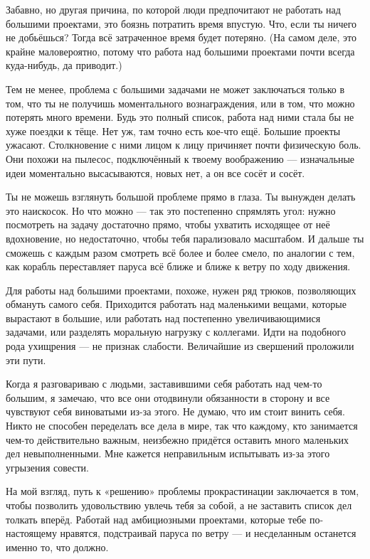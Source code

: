 \documentclass[ebook,12pt,oneside,openany]{memoir}
\begin{document}
Забавно, но другая причина, по которой люди предпочитают не работать
над большими проектами, это боязнь потратить время впустую. Что, если
ты ничего не добьёшься? Тогда всё затраченное время будет потеряно.
(На самом деле, это крайне маловероятно, потому что работа над
большими проектами почти всегда куда-нибудь, да приводит.) \newline

Тем не менее, проблема с большими задачами не может заключаться только
в том, что ты не получишь моментального вознаграждения, или в том, что
можно потерять много времени. Будь это полный список, работа над ними
стала бы не хуже поездки к тёще. Нет уж, там точно есть кое-что ещё.
Большие проекты ужасают. Столкновение с ними лицом к лицу причиняет
почти физическую боль. Они похожи на пылесос, подключённый к твоему
воображению — изначальные идеи моментально высасываются, новых нет, а
он все сосёт и сосёт. \newline

Ты не можешь взглянуть большой проблеме прямо в глаза. Ты вынужден
делать это наискосок. Но что можно — так это постепенно спрямлять
угол: нужно посмотреть на задачу достаточно прямо, чтобы ухватить
исходящее от неё вдохновение, но недостаточно, чтобы тебя парализовало
масштабом. И дальше ты сможешь с каждым разом смотреть всё более и
более смело, по аналогии с тем, как корабль переставляет паруса всё
ближе и ближе к ветру по ходу движения. \newline

Для работы над большими проектами, похоже, нужен ряд трюков,
позволяющих обмануть самого себя. Приходится работать над маленькими
вещами, которые вырастают в большие, или работать над постепенно
увеличивающимися задачами, или разделять моральную нагрузку с
коллегами. Идти на подобного рода ухищрения — не признак слабости.
Величайшие из свершений проложили эти пути. \newline

Когда я разговариваю с людьми, заставившими себя работать над чем-то
большим, я замечаю, что все они отодвинули обязанности в сторону и все
чувствуют себя виноватыми из-за этого. Не думаю, что им стоит винить
себя. Никто не способен переделать все дела в мире, так что каждому,
кто занимается чем-то действительно важным, неизбежно придётся
оставить много маленьких дел невыполненными. Мне кажется неправильным
испытывать из-за этого угрызения совести. \newline

На мой взгляд, путь к «решению» проблемы прокрастинации заключается в
том, чтобы позволить удовольствию увлечь тебя за собой, а не заставить
список дел толкать вперёд. Работай над амбициозными проектами, которые
тебе по-настоящему нравятся, подстраивай паруса по ветру — и
несделанным останется именно то, что должно.
\end{document}
